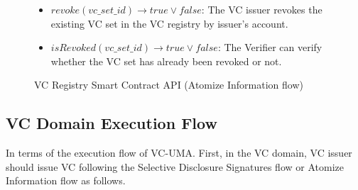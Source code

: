 \documentclass[conference, dvipdfmx]{IEEEtran} %
\begin{document}
\begin{sloppypar}
\begin{figure}[htbp]
\begin{center}
\begin{varwidth}{8.5cm}
{{\begin{itemize}
        \item $revoke(vc\_set\_id)  	\rightarrow true \lor false$: The VC issuer revokes the existing VC set in the VC registry by issuer’s account.
        
        \item $isRevoked(vc\_set\_id)  \rightarrow true \lor false$: The Verifier can verify whether the VC set has already been revoked or not.
      \end{itemize}
    }
  }
  \end{varwidth}
  \end{center}
  \caption{VC Registry Smart Contract API (Atomize Information flow)}
  \label{fig:VC_Registry_API_ai_flow}
\end{figure}

\subsection{VC Domain Execution Flow}
In terms of the execution flow of VC-UMA. First, in the VC domain, VC issuer should issue VC following the Selective Disclosure Signatures flow or Atomize Information flow as follows.



\end{sloppypar}
\end{document}
